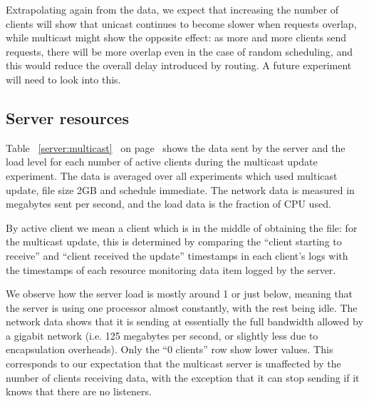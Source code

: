 \documentclass[a4paper,11pt,twocolumn]{article}
\newcommand{\pref}[1]{%
\ref{#1}%
\ifnum\thepage=0\pageref{#1}\else\ on page~\pageref{#1}\fi%
}
\begin{document}
Extrapolating again from the data, we expect that increasing the number
of clients will show that unicast continues to become slower when requests
overlap, while multicast might show the opposite effect: as more and more
clients send requests, there will be more overlap even in the case of random
scheduling, and this would reduce the overall delay introduced by routing.
A future experiment will need to look into this.

\subsection{Server resources}

Table~\pref{server:multicast} shows the data sent by the server and
the load level for each number of active clients during the multicast
update experiment. The data is averaged over all experiments which used
multicast update, file size 2GB and schedule immediate. The network
data is measured in megabytes sent per second, and the load data is the
fraction of CPU used.

By active client we mean a client which is in the middle of obtaining
the file: for the multicast update, this is determined by comparing
the ``client starting to receive'' and ``client received the update''
timestamps in each client's logs with the timestamps of each resource
monitoring data item logged by the server.

We observe how the server load is mostly around 1 or just below,
meaning that the server is using one processor almost constantly,
with the rest being idle. The network data shows that it is sending at
essentially the full bandwidth allowed by a gigabit network (i.e. 125
megabytes per second, or slightly less due to encapsulation overheads).
Only the ``0 clients'' row show lower values.  This corresponds to our
expectation that the multicast server is unaffected by the number of
clients receiving data, with the exception that it can stop sending if
it knows that there are no listeners.
\end{document}
